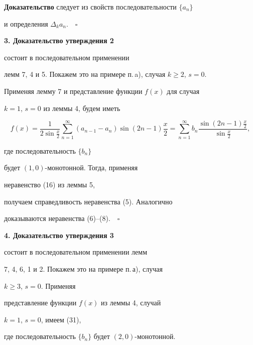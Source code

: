 {\bf Доказательство } следует из свойств последовательности $\{a_n \}$


и определения $\Delta_k a_n$.$\quad\square$


\medskip





{\bf 3. Доказательство утверждения 2} 


состоит в последовательном применении


лемм 7, 4 и 5. Покажем это на примере п.\,a), случая $k\geq 2$, $s=0$.





Применяя лемму 7 и представление функции $f(x)$ для случая


$k=1$, $s=0$ из леммы 4, будем иметь 


\begin{equation}


f(x)=\frac{1}{2\sin {\frac{x}{2}}}


\sum\limits_{n=1}^{\infty} (a_{n-1} - a_n)


\sin {(2n-1) \frac{x}{2}} = \sum\limits_{n=1}^{\infty}


b_n \frac {\sin {(2n-1)\frac{x}{2}} }


{\sin \frac{x}{2}},


\end{equation}


где последовательность $\{b_n\}$ 


будет $(1,0)$-монотонной. Тогда, применяя


неравенство (16) из леммы 5, 


получаем справедливость неравенства (5). Аналогично


доказываются неравенства (6)--(8).$\quad\square$


\medskip





{\bf 4. Доказательство утверждения 3} 


состоит в последовательном применении лемм


7, 4, 6, 1 и 2. Покажем это на примере п.\,а), случая


$k \geq 3$, $s=0$. Применяя 


представление функции $f(x)$ из леммы 4, случай


$k=1$, $s=0$, имеем (31),


где последовательность $\{b_n\}$ будет $(2,0)$-монотонной.


